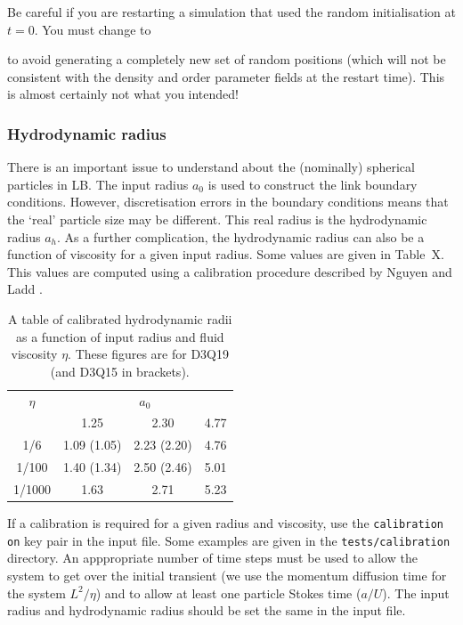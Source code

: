 Be careful if you are restarting a simulation that used the random
initialisation at $t=0$. You must change to 


to avoid generating a completely new set of random positions
(which will not be consistent with the density and order parameter
fields at the restart time). This is almost certainly not what you
intended!

\subsubsection{Hydrodynamic radius}

There is an important issue to understand about the (nominally)
spherical particles in LB. The input radius $a_0$ is used to
construct the link boundary conditions. However, discretisation
errors in the boundary conditions means that the `real' particle
size may be different. This real radius is the hydrodynamic radius $a_h$.
As a further complication, the hydrodynamic radius can also
be a function of viscosity for a given input radius. Some values
are given in Table~X. This values are computed using a calibration
procedure described by Nguyen and Ladd \cite{nguyen-ladd2002}.

\begin{table}[h]
\begin{center}
\begin{tabular}{|c|c|c|c|}
\hline
$\eta$ & \multicolumn{3}{c|}{$a_0$}\\ \cline{2-4} 
       & 1.25 & 2.30 & 4.77 \\
\hline
1/6  & 1.09 (1.05) & 2.23 (2.20) & 4.76 \\
1/100  & 1.40 (1.34) & 2.50 (2.46) & 5.01 \\
1/1000  & 1.63 & 2.71 & 5.23 \\
\hline
\end{tabular}
\end{center}
\caption{A table of calibrated hydrodynamic radii as a function of input
radius and fluid viscosity $\eta$. These figures are for D3Q19 (and D3Q15
in brackets).}
\end{table}

If a calibration is required for a given radius and viscosity,
use the \texttt{calibration on} key pair in the input file. Some
examples are given in the \texttt{tests/calibration} directory.
An apppropriate
number of time steps must be used to allow the system to get over
the initial transient (we use the momentum diffusion time for the
system $L^2/\eta$) and to allow at least one
particle Stokes time ($a/U$). The input radius and hydrodynamic
radius should be set the same in the input file.

